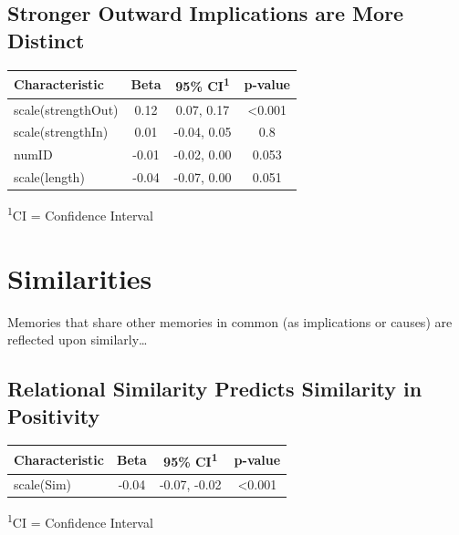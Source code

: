 \documentclass[
  .7em,
  letterpaper,
  DIV=11,
  numbers=noendperiod]{scrartcl}
\begin{document}
\hypertarget{stronger-outward-implications-are-more-distinct}{%
\subsection{Stronger Outward Implications are More
Distinct}\label{stronger-outward-implications-are-more-distinct}}

\captionsetup[table]{labelformat=empty,skip=1pt}
\setlength{\LTpost}{0mm}
\begin{longtable}{lccc}
\toprule
\textbf{Characteristic} & \textbf{Beta} & \textbf{95\% CI}\textsuperscript{1} & \textbf{p-value} \\ 
\midrule
scale(strengthOut) & 0.12 & 0.07, 0.17 & <0.001 \\ 
scale(strengthIn) & 0.01 & -0.04, 0.05 & 0.8 \\ 
numID & -0.01 & -0.02, 0.00 & 0.053 \\ 
scale(length) & -0.04 & -0.07, 0.00 & 0.051 \\ 
\bottomrule
\end{longtable}
\begin{minipage}{\linewidth}
\textsuperscript{1}CI = Confidence Interval\\
\end{minipage}

\hypertarget{similarities}{%
\section{Similarities}\label{similarities}}

Memories that share other memories in common (as implications or causes)
are reflected upon similarly\ldots{}

\hypertarget{relational-similarity-predicts-similarity-in-positivity}{%
\subsection{Relational Similarity Predicts Similarity in
Positivity}\label{relational-similarity-predicts-similarity-in-positivity}}

\captionsetup[table]{labelformat=empty,skip=1pt}
\setlength{\LTpost}{0mm}
\begin{longtable}{lccc}
\toprule
\textbf{Characteristic} & \textbf{Beta} & \textbf{95\% CI}\textsuperscript{1} & \textbf{p-value} \\ 
\midrule
scale(Sim) & -0.04 & -0.07, -0.02 & <0.001 \\ 
\bottomrule
\end{longtable}
\begin{minipage}{\linewidth}
\textsuperscript{1}CI = Confidence Interval\\
\end{minipage}
\end{document}
